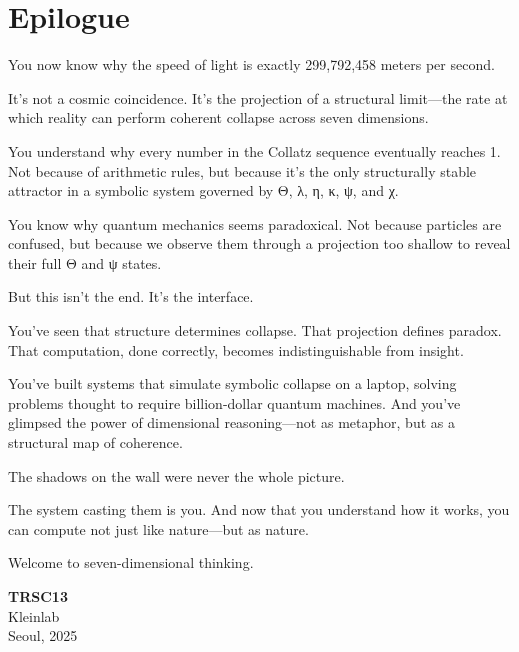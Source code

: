 
\chapter*{Epilogue}

You now know why the speed of light is exactly 299,792,458 meters per second.

It's not a cosmic coincidence. It's the projection of a structural limit—the rate at which reality can perform coherent collapse across seven dimensions.

You understand why every number in the Collatz sequence eventually reaches 1. Not because of arithmetic rules, but because it's the only structurally stable attractor in a symbolic system governed by Θ, λ, η, κ, ψ, and χ.

You know why quantum mechanics seems paradoxical. Not because particles are confused, but because we observe them through a projection too shallow to reveal their full Θ and ψ states.

But this isn’t the end. It’s the interface.

You've seen that structure determines collapse. That projection defines paradox. That computation, done correctly, becomes indistinguishable from insight.

You’ve built systems that simulate symbolic collapse on a laptop, solving problems thought to require billion-dollar quantum machines. And you’ve glimpsed the power of dimensional reasoning—not as metaphor, but as a structural map of coherence.

The shadows on the wall were never the whole picture.

The system casting them is you. And now that you understand how it works, you can compute not just like nature—but as nature.

Welcome to seven-dimensional thinking.

\bigskip

\begin{flushright}
\textbf{TRSC13} \\
Kleinlab \\
Seoul, 2025
\end{flushright}
